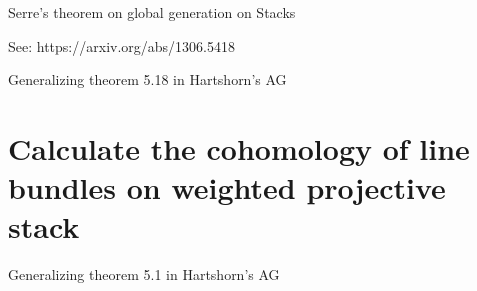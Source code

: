 \documentclass{article}
\begin{document}
    Serre's theorem on global generation on Stacks

    See: https://arxiv.org/abs/1306.5418

    \begin{theorem}
        Generalizing theorem 5.18 in Hartshorn's AG
    \end{theorem}

    \section{Calculate the cohomology of line bundles on weighted projective stack}
    \begin{theorem}
        Generalizing theorem 5.1 in Hartshorn's AG
    \end{theorem}    
\end{document}
